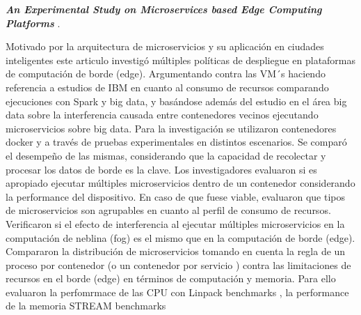 
\textbf{\emph{An Experimental Study on Microservices based Edge Computing Platforms}} 
\cite{qu_experimental_2020}.

Motivado por la arquitectura de microservicios y su aplicación en ciudades inteligentes
este articulo investigó múltiples políticas de despliegue en plataformas de computación de borde (edge).
Argumentando contra las VM´s haciendo referencia a estudios de IBM en cuanto al consumo de recursos \cite{IBM_DockerVsVm_s} comparando ejecuciones con Spark %
y big data, y basándose además del estudio en el área big data sobre la interferencia causada entre contenedores vecinos ejecutando microservicios sobre big data.%
Para la investigación se utilizaron contenedores docker y a través de pruebas experimentales en distintos escenarios. Se comparó el desempeño de las mismas, considerando que la capacidad de recolectar y procesar los datos de borde es la clave.
Los investigadores evaluaron si es apropiado ejecutar múltiples microservicios dentro de un contenedor considerando la performance del dispositivo.
En caso de que fuese viable, evaluaron que tipos de microservicios son agrupables en cuanto al perfil de consumo de recursos.
Verificaron si el efecto de interferencia al ejecutar múltiples microservicios en la computación de neblina (fog) es el mismo que en la computación de borde (edge). Compararon la distribución de microservicios tomando en cuenta la regla de un proceso por contenedor (o un contenedor por servicio \cite{cont_por_serv} ) contra las limitaciones de recursos en el borde (edge) en términos de computación y memoria. Para ello evaluaron la perfomrmace de las CPU con Linpack benchmarks %
, la performance de la memoria STREAM benchmarks %
